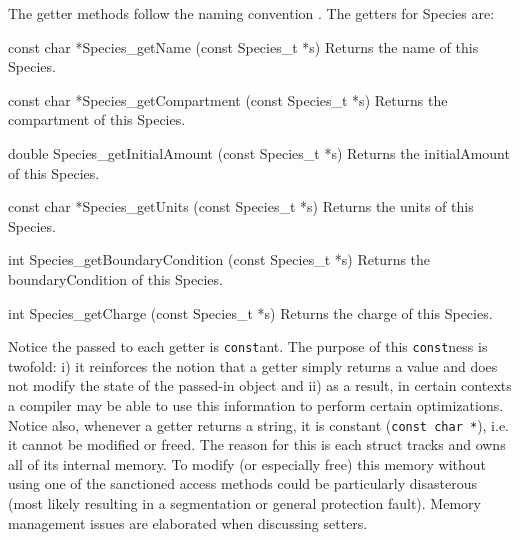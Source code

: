 \documentclass{sbmlmanual}
\begin{document}
The getter methods follow the naming convention
.  The getters for Species are:


\begin{methoddef}{const char *Species\_getName (const Species\_t *s)}
  Returns the name of this Species.
\end{methoddef}

\begin{methoddef}{const char *Species\_getCompartment (const Species\_t *s)}
  Returns the compartment of this Species.
\end{methoddef}

\begin{methoddef}{double Species\_getInitialAmount (const Species\_t *s)}
  Returns the initialAmount of this Species.
\end{methoddef}

\begin{methoddef}{const char *Species\_getUnits (const Species\_t *s)}
  Returns the units of this Species.
\end{methoddef}

\begin{methoddef}{int Species\_getBoundaryCondition (const Species\_t *s)}
  Returns the boundaryCondition of this Species.
\end{methoddef}

\begin{methoddef}{int Species\_getCharge (const Species\_t *s)}
  Returns the charge of this Species.
\end{methoddef}

Notice the  passed to each getter is
\texttt{const}ant.  The purpose of this \texttt{const}ness is twofold:
i) it reinforces the notion that a getter simply returns a value and
does not modify the state of the passed-in object and ii) as a result,
in certain contexts a compiler may be able to use this information to
perform certain optimizations.  Notice also, whenever a getter returns
a string, it is constant (\texttt{const char *}), i.e. it cannot be
modified or freed.  The reason for this is each struct tracks and owns
all of its internal memory.  To modify (or especially free) this
memory without using one of the sanctioned access methods could be
particularly disasterous (most likely resulting in a segmentation or
general protection fault).  Memory management issues are elaborated
when discussing setters.


\end{document}
